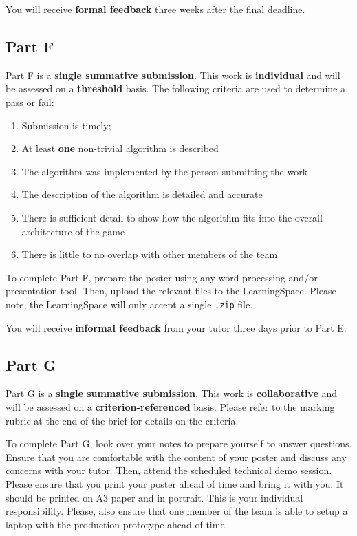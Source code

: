 \documentclass{../fal_assignment}
\begin{document}
You will receive \textbf{formal feedback} three weeks after the final deadline.

\subsection*{Part F}

Part F is a \textbf{single summative submission}. This work is \textbf{individual} and will be assessed on a \textbf{threshold} basis. The following criteria are used to determine a pass or fail:

\begin{enumerate}[label=(\alph*)]
	\item Submission is timely;
	\item At least \textbf{one} non-trivial algorithm is described
	\item The algorithm was implemented by the person submitting the work
	\item The description of the algorithm is detailed and accurate
	\item There is sufficient detail to show how the algorithm fits into the overall architecture of the game
	\item There is little to no overlap with other members of the team
\end{enumerate}

To complete Part F, prepare the poster using any word processing and/or presentation tool. Then, upload the relevant files to the LearningSpace. Please note, the LearningSpace will only accept a single \texttt{.zip} file.

You will receive \textbf{informal feedback} from your tutor three days prior to Part E.

\subsection*{Part G}

Part G is a \textbf{single summative submission}. This work is \textbf{collaborative} and will be assessed on a \textbf{criterion-referenced} basis. Please refer to the marking rubric at the end of the brief for details on the criteria.

To complete Part G, look over your notes to prepare yourself to answer questions. Ensure that you are comfortable with the content of your poster and discuss any concerns with your tutor. Then, attend the scheduled technical demo session. Please ensure that you print your poster ahead of time and bring it with you. It should be printed on A3 paper and in portrait. This is your individual responsibility. Please, also ensure that one member of the team is able to setup a laptop with the production prototype ahead of time.
\end{document}
